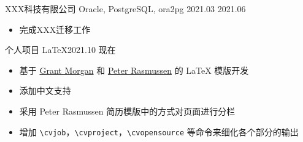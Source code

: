 \documentclass[10pt,a4paper]{xresume}
\begin{document}
\divider{}
          {XXX科技有限公司}
          {Oracle, PostgreSQL, ora2pg}
          {2021.03 \textendash{} 2021.06}
\begin{itemize}
\item 完成XXX迁移工作
\end{itemize}

\divider{}

          {个人项目}
          {\LaTeX{}}{2021.10 \textendash{} 现在}
\begin{itemize}
\item 基于 \href{https://www.overleaf.com/articles/grant-morgans-first-latex-resume/jtdbtcctgnrr}{Grant Morgan} 和 \href{https://www.overleaf.com/articles/peter-rasmussens-resume-data-scientist/bphkfprrcnwv}{Peter Rasmussen} 的 \LaTeX{} 模版开发
\item 添加中文支持
\item 采用 Peter Rasmussen 简历模版中的方式对页面进行分栏
\item 增加 \verb|\cvjob|，\verb|\cvproject|，\verb|\cvopensource| 等命令来细化各个部分的输出
\end{itemize}
\end{document}
